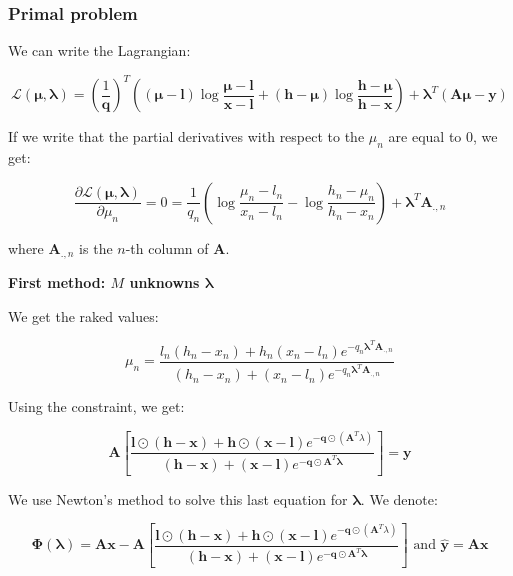 \documentclass{tex/note}
\begin{document}
\subsubsection{Primal problem}

We can write the Lagrangian:

\begin{equation*}
\mathcal{L} \left( \bm{\mu} , \bm{\lambda} \right) = \left( \frac{1}{\bm{q}} \right)^T \left( \left( \bm{\mu} - \bm{l}  \right) \log \frac{\bm{\mu} - \bm{l}}{\bm{x} - \bm{l}} + \left( \bm{h} - \bm{\mu} \right) \log \frac{\bm{h} - \bm{\mu}}{\bm{h} - \bm{x}} \right) + \bm{\lambda}^T \left( \bm{A} \bm{\mu} - \bm{y} \right)
\end{equation*}

If we write that the partial derivatives with respect to the $\mu_n$ are equal to $0$, we get:

\begin{equation*}
\frac{\partial \mathcal{L} \left( \bm{\mu} , \bm{\lambda} \right)}{\partial \mu_n} = 0 =
\frac{1}{q_n} \left( \log \frac{\mu_n - l_n}{x_n - l_n} - \log \frac{h_n - \mu_n}{h_n - x_n} \right) + \bm{\lambda}^T \bm{A}_{.,n}
\end{equation*}

where $\bm{A}_{.,n}$ is the $n$-th column of $\bm{A}$.

\textbf{First method: $M$ unknowns $\bm{\lambda}$}

We get the raked values:

\begin{equation*}
\mu_n = \frac{l_n \left( h_n - x_n \right) + h_n \left( x_n - l_n \right) e^{ - q_n \bm{\lambda}^T \bm{A}_{.,n}}}{ \left( h_n - x_n \right) + \left( x_n - l_n \right) e^{ - q_n \bm{\lambda}^T \bm{A}_{.,n}}} 
\end{equation*}

Using the constraint, we get:

\begin{equation*}
\bm{A} \left[ \frac{\bm{l} \odot \left( \bm{h} - \bm{x} \right) + \bm{h} \odot \left( \bm{x} - \bm{l} \right) e^{ - \bm{q} \odot \left( \bm{A}^T \lambda \right)}}{ \left( \bm{h} - \bm{x} \right) + \left( \bm{x} - \bm{l} \right) e^{ - \bm{q} \odot \bm{A}^T \bm{\lambda}}} \right] = \bm{y}
\end{equation*}

We use Newton’s method to solve this last equation for $\bm{\lambda}$. We denote:

\begin{equation*}
\bm{\Phi} \left( \bm{\lambda} \right) = \bm{A} \bm{x} - \bm{A} \left[ \frac{\bm{l} \odot \left( \bm{h} - \bm{x} \right) + \bm{h} \odot \left( \bm{x} - \bm{l} \right) e^{ - \bm{q} \odot \left( \bm{A}^T \lambda \right)}}{ \left( \bm{h} - \bm{x} \right) + \left( \bm{x} - \bm{l} \right) e^{ - \bm{q} \odot \bm{A}^T \bm{\lambda}}} \right] \text{ and } \hat{\bm{y}} = \bm{A} \bm{x}
\end{equation*}
\end{document}
